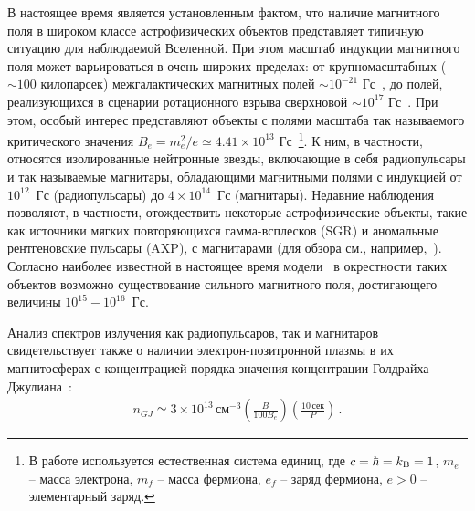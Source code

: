 \intro

В настоящее время является установленным фактом, что наличие магнитного поля в широком классе астрофизических 
объектов представляет типичную ситуацию для наблюдаемой Вселенной. При этом масштаб индукции 
магнитного поля может варьироваться в очень широких пределах: от крупномасштабных ($\sim 100$ килопарсек) межгалактических магнитных полей  
$\sim 10^{-21}$ Гс~\cite{Ryu:2012}, 
до полей, реализующихся в сценарии ротационного взрыва 
сверхновой $\sim 10^{17}$ Гс~\cite{Bisnovatyi-Kogan:1970, Bisnovatyi-Kogan:1989}. 
При этом, особый интерес представляют объекты с 
полями масштаба так называемого критического значения  $B_e = m_e^2/e \simeq 4.41 \times 10^{13}$ Гс~\footnote{В работе 
используется естественная система единиц, где
$c = \hbar = k_{\rm{B}} = 1$, $m_e$ -- масса электрона, $m_f$ -- масса фермиона, 
$e_f$ -- заряд фермиона, $e > 0$ -- элементарный заряд.}. К ним, 
в частности, относятся изолированные нейтронные звезды, включающие в себя радиопульсары и так называемые магнитары, 
обладающими магнитными полями с индукцией от $10^{12}$~Гс (радиопульсары) до $4\times 10^{14}$~Гс
(магнитары). Недавние наблюдения 
позволяют, в частности, отождествить  некоторые  астрофизические объекты, такие как источники 
мягких повторяющихся гамма-всплесков (SGR) и  аномальные рентгеновские пульсары (AXP),   
с магнитарами (для обзора см., например,~\cite{Olausen:2014}).
 Согласно наиболее известной в настоящее время модели~\cite{Thompson:1995,Duncan:1996,Lyutikov:2002}   
в окрестности таких объектов возможно существование  
сильного  магнитного поля, достигающего величины  $10^{15} - 10^{16}$~Гс.


Анализ спектров излучения как радиопульсаров, так и магнитаров свидетельствует также о наличии 
электрон-позитронной плазмы в их магнитосферах с  концентрацией порядка значения концентрации  
Голдрайха-Джулиана~\cite{GJ:1969}: 
%
\begin{eqnarray}
\label{eq:ngj}
n_{GJ} \simeq 
 3\times 10^{13}\, \mbox{см}^{-3} 
\left (\frac{B}{100B_e} \right )\left (\frac{10\,\mbox{сек}}{P} \right ) \, .
\end{eqnarray}                                         

